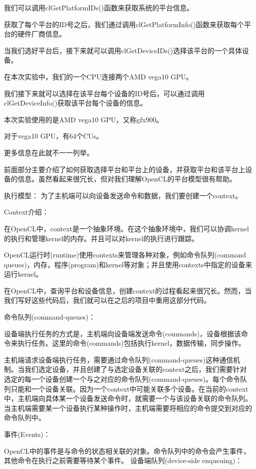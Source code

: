 我们可以调用clGetPlatformIDs()函数来获取系统的平台信息。

获取了每个平台的ID号之后，我们通过调用clGetPlatformInfo()函数来获取每个平台的硬件厂商信息。

当我们选好平台后，接下来就可以调用clGetDeviceIDs()选择该平台的一个具体设备。

在本次实验中，我们的一个CPU连接两个AMD vega10 GPU。

我们接下来就可以选择在该平台每个设备的ID号后，可以通过调用clGetDeviceInfo()获取该平台每个设备的信息。

本次实验使用的是AMD vega10 GPU，又称gfx900。

对于vega10 GPU，有64个CUs。

更多信息在此就不一一列举。

前面部分主要介绍了如何获取选择平台和平台上的设备，并获取平台和该平台上设备的信息。虽然看起来很冗长，但对我们理解OpenCL的平台模型很有帮助。

执行模型：
为了主机端可以向设备发送命令和数据，我们要创建一个context。

Context介绍：

在OpenCL中，context是一个抽象环境。在这个抽象环境中，我们可以协调kernel的执行和管理kernel的内存。并且可以对kernel的执行进行跟踪。

OpenCL运行时(runtime)使用contexts来管理各种对象，例如命令队列(command queues)，内存，程序(program)和kernel等对象；并且使用contexts中指定的设备来运行kernel。

在OpenCL中，查询平台和设备信息，创建context的过程看起来很冗长。然而，当我们写好这些代码后，我们就可以在之后的项目中重用这部分代码。

命令队列(command-queues)：

设备端执行任务的方式是，主机端向设备端发送命令(commands)，设备根据该命令来执行任务。这里的命令(commands)包括执行kernel，数据传输，同步操作。

主机端请求设备端执行任务，需要通过命令队列(command-queues)这种通信机制。当我们选定设备，并且创建了与选定设备关联的context之后，我们需要针对选定的每一个设备创建一个与之对应的命令队列(command-queues)。每个命令队列只能和一个设备关联。因为一个context中可能关联多个设备。在当前的context中，主机端向具体某一个设备发送命令时，就需要一个与该设备关联的命令队列。
当主机端需要某一个设备执行某种操作时，主机端需要将相应的命令提交到对应的命令队列中。

事件(Events)：

OpenCL中的事件是与命令的状态相关联的对象。命令队列中的命令会产生事件，其他命令在执行之前需要等待某个事件。
设备端队列(device-side enqueuing)：

